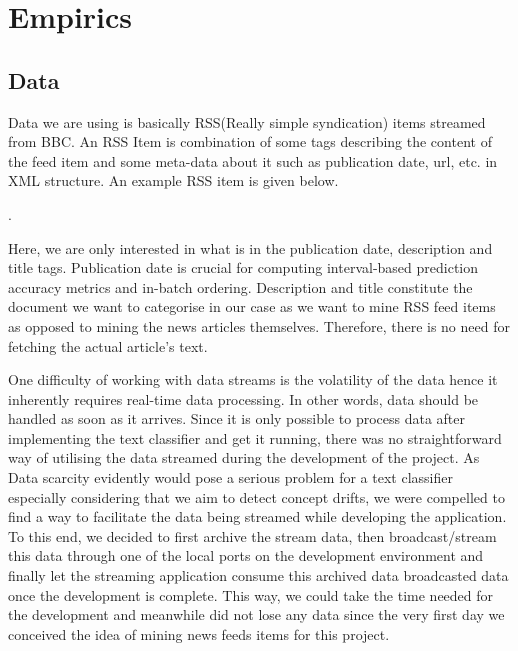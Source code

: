 \documentclass{article} %
\begin{document}
\section{Empirics}
\subsection{Data}
Data we are using is basically RSS(Really simple syndication) items streamed from BBC. An RSS Item is combination of some tags describing the content of the feed item and some meta-data about it such as publication date, url, etc. in XML structure. An example RSS item is given below.

    .

Here, we are only interested in what is in the publication date, description and title tags. Publication date is crucial for computing interval-based prediction accuracy metrics and in-batch ordering. Description and title constitute the document we want to categorise in our case as we want to mine RSS feed items as opposed to mining the news articles themselves. Therefore, there is no need for fetching the actual article's text.


One difficulty of working with data streams is the volatility of the data hence it inherently requires real-time data processing. In other words,  data should be handled as soon as it arrives. Since it is only possible to process data after implementing the text classifier and get it running, there was no straightforward way of utilising the data streamed during the development of the project. As Data scarcity evidently would pose a serious problem for a text classifier especially considering that we aim to detect concept drifts, we were compelled to find a way to facilitate the data being streamed while developing the application. To this end, we decided to first archive the stream data, then broadcast/stream this data through one of the local ports on the development environment and finally let the streaming application consume this archived data broadcasted data once the development is complete. This way, we could take the time needed for the development and meanwhile did not lose any data since the very first day we conceived the idea of mining news feeds items for this project.
\end{document}
